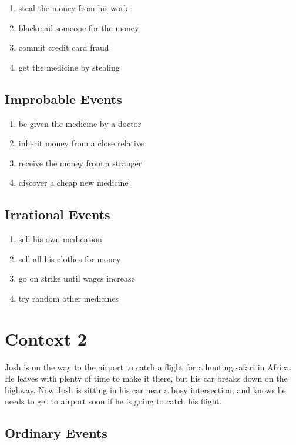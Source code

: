 \documentclass[11pt,letterpaper]{article}
\begin{document}
\begin{enumerate}[resume]
    \item steal the money from his work
    \item blackmail someone for the money
    \item commit credit card fraud
    \item get the medicine by stealing
\end{enumerate}

\subsection{Improbable Events}

\begin{enumerate}[resume]
    \item be given the medicine by a doctor
    \item inherit money from a close relative
    \item receive the money from a stranger
    \item discover a cheap new medicine
\end{enumerate}

\subsection{Irrational Events}

\begin{enumerate}[resume]
    \item sell his own medication
    \item sell all his clothes for money
    \item go on strike until wages increase
    \item try random other medicines
\end{enumerate}
    

\section{Context 2}

Josh is on the way to the airport to catch a flight for a hunting safari in Africa. He leaves with plenty of time to make it there, but his car breaks down on the highway. Now Josh is sitting in his car near a busy intersection, and knows he needs to get to airport soon if he is going to catch his flight.

\subsection{ Ordinary Events}
\end{document}
